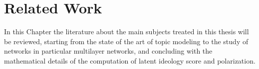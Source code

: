 
\chapter{Related Work}%
\label{Ch:related}

\ifpdf
    \graphicspath{{Chapter2/Figs/Raster/}{Chapter2/Figs/PDF/}{Chapter2/Figs/}}
\else
    \graphicspath{{Chapter2/Figs/Vector/}{Chapter2/Figs/}}
\fi

In this Chapter  the literature about the main subjects treated in this thesis will be reviewed, starting from the state of the art of topic modeling to the study of networks in particular multilayer networks, and concluding with the mathematical details of the computation of latent ideology score and polarization.










